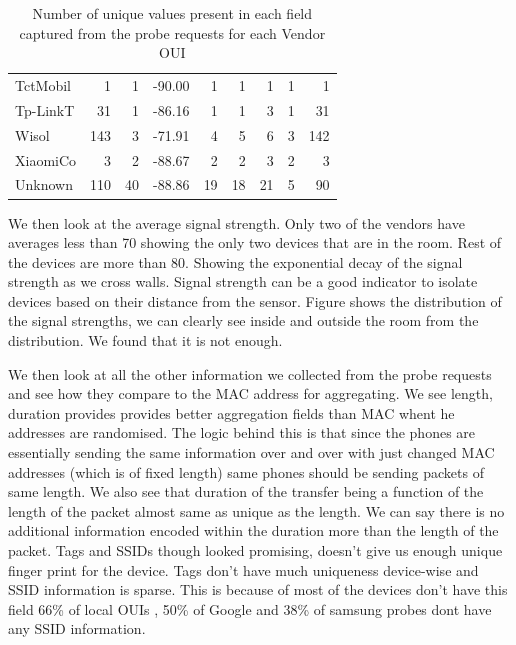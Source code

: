 \begin{table}
\begin{center}
\begin{tabular}{lrrrrrrrr}
  TctMobil &    1 &   1 & -90.00 &   1 &   1 &   1 &   1 &   1 \\ 
  Tp-LinkT &   31 &   1 & -86.16 &   1 &   1 &   3 &   1 &  31 \\ 
  Wisol    &  143 &   3 & -71.91 &   4 &   5 &   6 &   3 & 142 \\ 
  XiaomiCo &    3 &   2 & -88.67 &   2 &   2 &   3 &   2 &   3 \\ 
  Unknown  &  110 &  40 & -88.86 &  19 &  18 &  21 &   5 &  90 \\ 
  \bottomrule
  \end{tabular}
\end{center}
\caption{Number of unique values present in each field captured from the probe requests for each Vendor OUI}
\label{table:collection:proberequest}
\end{table}

We then look at the average signal strength.
Only two of the vendors have averages less than 70 showing the only two devices that are in the room.
Rest of the devices are more than 80. Showing the exponential decay of the signal strength as we cross walls.
Signal strength can be a good indicator to isolate devices based on their distance from the sensor.
Figure shows the distribution of the signal strengths, we can clearly see inside and outside the room from the distribution.
We found that it is not enough.

We then look at all the other information we collected from the probe requests and see how they compare to the MAC address for aggregating.
We see length, duration provides provides better aggregation fields than MAC whent he addresses are randomised.
The logic behind this is that since the phones are essentially sending the same information over and over with just changed MAC addresses (which is of fixed length) same phones should be sending packets of same length.
We also see that duration of the transfer being a function of the length of the packet almost same as unique as the length.
We can say there is no additional information encoded within the duration more than the length of the packet.
Tags and SSIDs though looked promising, doesn't give us enough unique finger print for the device.
Tags don't have much uniqueness device-wise and SSID information is sparse.
This is because of most of the devices don't have this field 66\% of local OUIs , 50\% of Google and 38\% of samsung probes dont have any SSID information.

